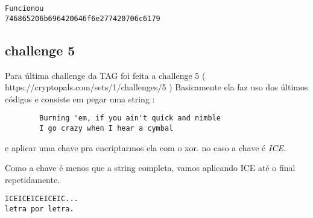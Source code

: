 \documentclass[11pt]{article}
\begin{document}
    \begin{Verbatim}[commandchars=\\\{\}]
Funcionou
746865206b696420646f6e277420706c6179
\end{Verbatim}

    \subsection{challenge 5}\label{challenge-5}

Para última challenge da TAG foi feita a challenge 5 (
https://cryptopals.com/sets/1/challenges/5 ) Basicamente ela faz uso dos
últimos códigos e consiste em pegar uma string :

\begin{verbatim}
        Burning 'em, if you ain't quick and nimble
        I go crazy when I hear a cymbal
\end{verbatim}

e aplicar uma chave pra encriptarmos ela com o xor. no caso a chave é
\emph{ICE}.

Como a chave é menos que a string completa, vamos aplicando ICE até o
final repetidamente.

\begin{verbatim}
ICEICEICEICEIC...
letra por letra.
\end{verbatim}
\end{document}
